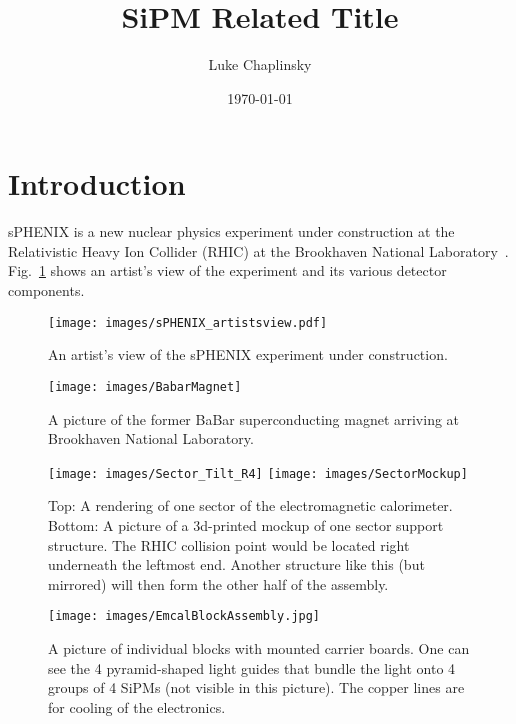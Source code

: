 \documentclass{article}
\title{SiPM Related Title}
\author{Luke Chaplinsky }
\date{\today}
\begin{document}
\maketitle

\section{Introduction}

sPHENIX is a new nuclear physics experiment under construction at the
Relativistic Heavy Ion Collider (RHIC) at the Brookhaven National
Laboratory~\cite{Adare:2015kwa}. Fig.~\ref{fig:sPHENIXArtistsView}
shows an artist's view of the experiment and its various detector
components.

\begin{figure}[tbh]
\centering \texttt{[image: images/sPHENIX\_artistsview.pdf]}
\caption{\label{fig:sPHENIXArtistsView}
  An artist's view of the sPHENIX experiment under construction.
}
\end{figure}

\begin{figure}[tbh]
\centering \texttt{[image: images/BabarMagnet]}
\caption{\label{fig:BabarMagnet} A picture of the former BaBar
  superconducting magnet arriving at Brookhaven National Laboratory.
}
\end{figure}

\begin{figure}[tbh]
\centering \texttt{[image: images/Sector\_Tilt\_R4]}
\centering \texttt{[image: images/SectorMockup]}

\caption{\label{fig:EmcalSector} Top: A rendering of one sector of the
  electromagnetic calorimeter.  Bottom: A picture of a 3d-printed
  mockup of one sector support structure.  The RHIC collision point
  would be located right underneath the leftmost end. Another
  structure like this (but mirrored) will then form the other half of
  the assembly.
}
\end{figure}

\begin{figure}[tbh]
\centering \texttt{[image: images/EmcalBlockAssembly.jpg]}
\caption{\label{fig:EmcalBlockAssembly} A picture of individual blocks with mounted carrier boards. One can see the 4 pyramid-shaped light guides that bundle the light onto 4 groups of 4 SiPMs (not visible in this picture). The copper lines are for cooling of the electronics. 
}
\end{figure}
\end{document}
